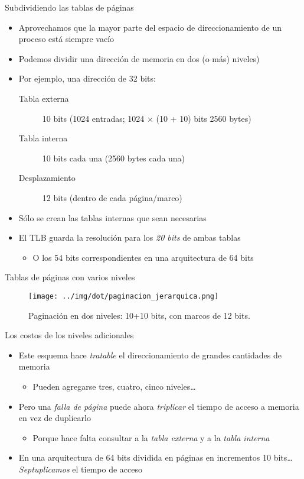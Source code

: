 \documentclass[presentation]{beamer}
\begin{document}
\begin{frame}[label={sec:org05615aa}]{Subdividiendo las tablas de páginas}
\begin{itemize}
\item Aprovechamos que la mayor parte del espacio de direccionamiento de
un proceso está siempre vacío
\item Podemos dividir una dirección de memoria en dos (o más) niveles)
\item Por ejemplo, una dirección de 32 bits:
\begin{description}
\item[{Tabla externa}] 10 bits (1024 entradas; 1024 × (10 + 10) bits
2560 bytes)
\item[{Tabla interna}] 10 bits cada una (2560 bytes cada una)
\item[{Desplazamiento}] 12 bits (dentro de cada página/marco)
\end{description}
\item Sólo se crean las tablas internas que sean necesarias
\item El TLB guarda la resolución para los \emph{20 bits} de ambas tablas
\begin{itemize}
\item O los 54 bits correspondientes en una arquitectura de 64 bits
\end{itemize}
\end{itemize}
\end{frame}

\begin{frame}[label={sec:org6942d29}]{Tablas de páginas con varios niveles}
\begin{figure}[htbp]
\centering
\texttt{[image: ../img/dot/paginacion\_jerarquica.png]}
\caption{Paginación en dos niveles: 10+10 bits, con marcos de 12 bits.}
\end{figure}
\end{frame}

\begin{frame}[label={sec:org2dd93aa}]{Los costos de los niveles adicionales}
\begin{itemize}
\item Este esquema hace \emph{tratable} el direccionamiento de grandes
cantidades de memoria
\begin{itemize}
\item Pueden agregarse tres, cuatro, cinco niveles\ldots{}
\end{itemize}
\item Pero una \emph{falla de página} puede ahora \emph{triplicar} el tiempo de
acceso a memoria en vez de duplicarlo
\begin{itemize}
\item Porque hace falta consultar a la \emph{tabla externa} y a la \emph{tabla interna}
\end{itemize}
\item En una arquitectura de 64 bits dividida en páginas en incrementos 10
bits\ldots{} \emph{Septuplicamos} el tiempo de acceso
\end{itemize}
\end{frame}
\end{document}
